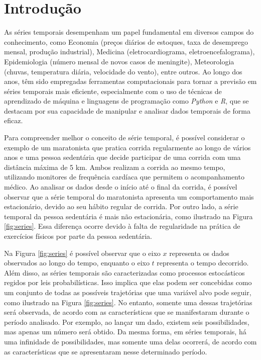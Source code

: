 



\section{Introdu{\c c}{\~a}o} \label{sec:int}


As séries temporais desempenham um papel fundamental em diversos campos do conhecimento, como Economia (preços diários de estoques, taxa de desemprego mensal, produção industrial), Medicina (eletrocardiograma, eletroencefalograma), Epidemiologia (número mensal de novos casos de meningite), Meteorologia (chuvas, temperatura diária, velocidade do vento), entre outros. Ao longo dos anos, têm sido empregadas ferramentas computacionais para tornar a previsão em séries temporais mais eficiente, especialmente com o uso de técnicas de aprendizado de máquina e linguagens de programação como \textit{Python} e \textit{R}, que se destacam por sua capacidade de manipular e analisar dados temporais de forma eficaz.

Para compreender melhor o conceito de série temporal, é possível considerar o exemplo de um maratonista que pratica corrida regularmente ao longo de vários anos e uma pessoa sedentária que decide participar de uma corrida com uma distância máxima de 5 km. Ambos realizam a corrida ao mesmo tempo, utilizando monitores de frequência cardíaca que permitem o acompanhamento médico. Ao analisar os dados desde o início até o final da corrida, é possível observar que a série temporal do maratonista apresenta um comportamento mais estacionário, devido ao seu hábito regular de corrida. Por outro lado, a série temporal da pessoa sedentária é mais não estacionária, como ilustrado na Figura \ref{fig:series}. Essa diferença ocorre devido à falta de regularidade na prática de exercícios físicos por parte da pessoa sedentária.


Na Figura \ref{fig:series} é possível observar que o eixo $x$ representa os dados observados ao longo do tempo, enquanto o eixo $t$ representa o tempo decorrido. Além disso, as séries temporais são caracterizadas como processos estocásticos regidos por leis probabilísticas. Isso implica que elas podem ser concebidas como um conjunto de todas as possíveis trajetórias que uma variável alvo pode seguir, como ilustrado na Figura \ref{fig:series}. No entanto, somente uma dessas trajetórias será observada, de acordo com as características que se manifestaram durante o período analisado. Por exemplo, ao lançar um dado, existem seis possibilidades, mas apenas um número será obtido. Da mesma forma, em séries temporais, há uma infinidade de possibilidades, mas somente uma delas ocorrerá, de acordo com as características que se apresentaram nesse determinado período.

